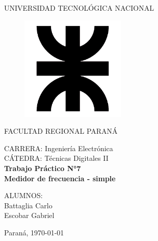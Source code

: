 \documentclass[a4paper, 12pt]{article}
\begin{document}
\begin{titlepage}
	\begin{center}
		{\large{UNIVERSIDAD TECNOLÓGICA NACIONAL}}
	\end{center}
	\vspace{15pt}
	\begin{figure}[!ht]
		\centering
		\begin{center}
			\includegraphics[width=5cm]{utn.png}
		\end{center}
	\end{figure}
	\vspace{5pt}
	\begin{center}
		{\large{FACULTAD REGIONAL PARANÁ}}
		\vspace{5pt}
		\begin{center}
			\vspace{15pt}
			\normalsize{CARRERA: Ingeniería Electrónica\\
						CÁTEDRA: Técnicas Digitales II\\}
			\vspace{50pt}
			\huge\bfseries{Trabajo Práctico N°7\\
				Medidor de frecuencia - simple\\}
\vspace{50pt}
		\end{center}
		
		\begin{flushleft}
			\begin{center}
				ALUMNOS:\\
				Battaglia Carlo\\
				Escobar Gabriel\\
			\end{center}
		\end{flushleft}
		
		\begin{center}
			\vspace{\fill}
			\normalsize{Paraná,}
			\today
		\end{center}
	\end{center}
\end{titlepage}
\end{document}
